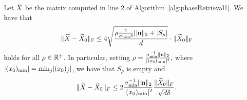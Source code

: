 
\begin{lemma}\label{lem:EtaBound}
Let $\tilde{X}$ be the matrix computed in line 2 of Algorithm~\ref{alg:phaseRetrieval1}.  We have that \begin{equation}\| \widetilde{X} - \widetilde{X}_0 \|_{\rm F} \leq 4 \sqrt{\frac{\rho \frac{1}{\sigma_{\min} \delta} \| \mathbf n \|_2 + \left| S_\rho \right|}{d}} \cdot \| \widetilde{X}_0 \|_{\rm F}\label{eq:rho_bound}\end{equation} holds for all $\rho \in \mathbb{R}^+$.  In particular, setting $\rho = \frac{\sigma_{\min}^{-1} \lVert\mathbf n\rVert_2}{\lvert(x_0)_{\min}\rvert^4},$ where $\lvert(x_0)_{\min}\rvert = \min_j \lvert(x_0)_j\rvert$, we have that $S_\rho$ is empty and \begin{equation} \lVert\widetilde{X} - \widetilde{X}_0\rVert_F \le 2 \frac{\sigma_{\min}^{-1} \lVert\mathbf n\rVert_2}{\lvert(x_0)_{\min}\rvert^2} \frac{\lVert\widetilde{X}_0\rVert_F}{\sqrt{d \delta}}.\label{eq:empty_rho}\end{equation}
\end{lemma}

